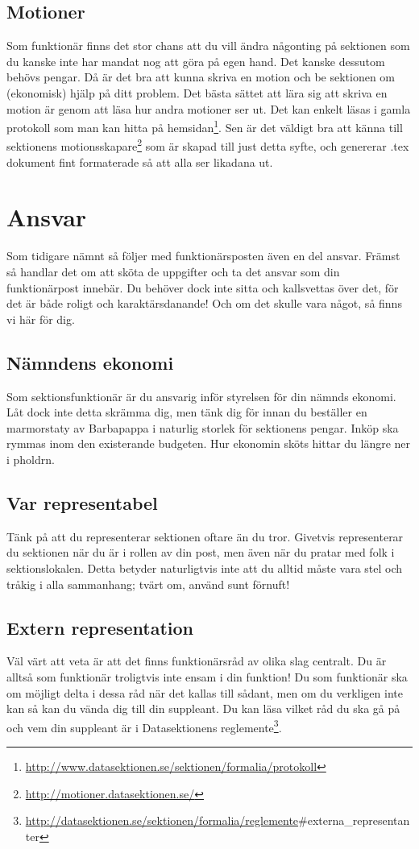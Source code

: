 \documentclass[a4paper,11pt]{article}
\begin{document}
\subsection{Motioner}
Som funktionär finns det stor chans att du vill ändra någonting på sektionen som du kanske inte har mandat nog att göra på egen hand. Det kanske dessutom behövs pengar. Då är det bra att kunna skriva en motion och be sektionen om (ekonomisk) hjälp på ditt problem. Det bästa sättet att lära sig att skriva en motion är genom att läsa hur andra motioner ser ut. Det kan enkelt läsas i gamla protokoll som man kan hitta på hemsidan\footnote{\url{http://www.datasektionen.se/sektionen/formalia/protokoll}}. Sen är det väldigt bra att känna till sektionens motionsskapare\footnote{\url{http://motioner.datasektionen.se/}} som är skapad till just detta syfte, och genererar .tex dokument fint formaterade så att alla ser likadana ut.


\section{Ansvar}
Som tidigare nämnt så följer med funktionärsposten även en del ansvar. Främst så handlar det om att sköta de uppgifter och ta det ansvar som din funktionärpost innebär. Du behöver dock inte sitta och kallsvettas över det, för det är både roligt och karaktärsdanande! Och om det skulle vara något, så finns vi här för dig.

\subsection{Nämndens ekonomi}
Som sektionsfunktionär är du ansvarig inför styrelsen för din nämnds ekonomi. Låt dock inte detta skrämma dig, men tänk dig för innan du beställer en marmorstaty av Barbapappa i naturlig storlek för sektionens pengar. Inköp ska rymmas inom den existerande budgeten. Hur ekonomin sköts hittar du längre ner i pholdrn.

\subsection{Var representabel}
Tänk på att du representerar sektionen oftare än du tror. Givetvis representerar du sektionen när du är i rollen av din post, men även när du pratar med folk i sektionslokalen. Detta betyder naturligtvis inte att du alltid måste vara stel och tråkig i alla sammanhang; tvärt om, använd sunt förnuft!


\subsection{Extern representation}
Väl värt att veta är att det finns funktionärsråd av olika slag centralt. Du är alltså som funktionär troligtvis inte ensam i din funktion! Du som funktionär ska om möjligt delta i dessa råd när det kallas till sådant, men om du verkligen inte kan så kan du vända dig till din suppleant. Du kan läsa vilket råd du ska gå på och vem din suppleant är i Datasektionens reglemente\footnote{\url{http://datasektionen.se/sektionen/formalia/reglemente}\#externa\_representanter}.
\end{document}
